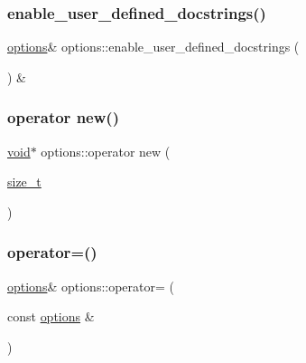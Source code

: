 \mbox{\label{classoptions_a44ceafcf829da82a6ecddc41050d3dc9}} 
\subsubsection{\texorpdfstring{enable\_user\_defined\_docstrings()}{enable\_user\_defined\_docstrings()}}
{\footnotesize\ttfamily \mbox{\hyperlink{classoptions}{options}}\& options\+::enable\+\_\+user\+\_\+defined\+\_\+docstrings (\begin{DoxyParamCaption}{ }\end{DoxyParamCaption}) \&\hspace{0.3cm}{\ttfamily [inline]}}

\mbox{\label{classoptions_aaa989a3a54bb17948c753569cb60b4cc}} 
\subsubsection{\texorpdfstring{operator new()}{operator new()}}
{\footnotesize\ttfamily \mbox{\hyperlink{_s_d_l__opengles2__gl2ext_8h_ae5d8fa23ad07c48bb609509eae494c95}{void}}$\ast$ options\+::operator new (\begin{DoxyParamCaption}\item[{\mbox{\hyperlink{detail_2common_8h_a801d6a451a01953ef8cbae6feb6a3638}{size\+\_\+t}}}]{ }\end{DoxyParamCaption})\hspace{0.3cm}{\ttfamily [delete]}}

\mbox{\label{classoptions_a42215bbd44ad5ca124d29a21649c1bb4}} 
\subsubsection{\texorpdfstring{operator=()}{operator=()}}
{\footnotesize\ttfamily \mbox{\hyperlink{classoptions}{options}}\& options\+::operator= (\begin{DoxyParamCaption}\item[{const \mbox{\hyperlink{classoptions}{options}} \&}]{ }\end{DoxyParamCaption})\hspace{0.3cm}{\ttfamily [delete]}}

